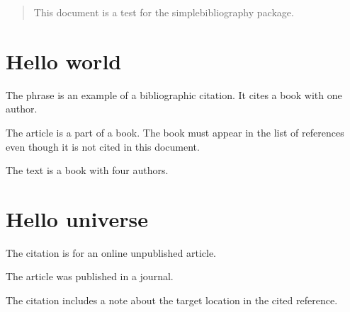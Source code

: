 \documentclass{article}
\begin{document}
\BNmakeTitle

\begin{abstract}
  This document is a test for the simplebibliography package.
\end{abstract}

\tableofcontents

\section{Hello world}
\label{sec:hello-world}


The phrase  is an example
of a bibliographic citation.  It cites a book with one author.

The article  is a part of a book.  The book
must appear in the list of references even though it is not cited in
this document.

The text  is a book with
four authors.

\section{Hello universe}
\label{sec:hello-universe}

The citation  is for an
online unpublished article.

The article  was
published in a journal.

The citation  includes a
note about the target location in the cited reference.

\SBprintbibliography
\end{document}
